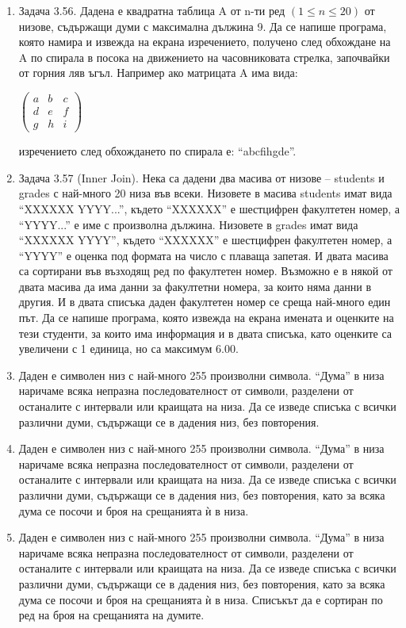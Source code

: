 {\begin{enumerate}[resume]
  \item Задача 3.56. \cite{sbornik} Дадена е квадратна таблица A от n-ти ред $(1 \le n \le 20)$ от низове, съдържащи думи с максимална дължина 9. Да се напише програма, която намира и извежда на екрана изречението, получено след обхождане на A по спирала в посока на движението на часовниковата стрелка, започвайки от горния ляв ъгъл. Например ако матрицата A има вида:

  $\left( \begin{array}{ccc}
  a & b & c \\
  d & e & f \\
  g & h & i
  \end{array} \right)$

  изречението след обхождането по спирала е: ``abcfihgde''.

  \item Задача 3.57 (Inner Join). \cite{sbornik} Нека са дадени два масива от низове – students и grades с най-много 20 низа във всеки. Низовете в масива students имат вида ``XXXXXX YYYY...'', където ``XXXXXX'' е шестцифрен факултетен номер, а ``YYYY...'' е име с произволна дължина. Низовете в grades имат вида ``XXXXXX YYYY'', където ``XXXXXX'' е шестцифрен факултетен номер, а ``YYYY'' е оценка под формата на число с плаваща запетая. И двата масива са сортирани във възходящ ред по факултетен номер. Възможно е в някой от двата масива да има данни за факултетни номера, за които няма данни в другия. И в двата списъка даден факултетен номер се среща най-много един път. Да се напише програма, която извежда на екрана имената и оценките на тези студенти, за които има информация и в двата списъка, като оценките са увеличени с 1 единица, но са максимум 6.00.
  
  \item Даден е символен низ с най-много 255 произволни символа. ``Дума'' в низа наричаме всяка непразна последователност от символи, разделени от останалите с интервали или краищата на низа. Да се изведе списъка с всички различни думи, съдържащи се в дадения низ, без повторения.

  \item Даден е символен низ с най-много 255 произволни символа. ``Дума'' в низа наричаме всяка непразна последователност от символи, разделени от останалите с интервали или краищата на низа. Да се изведе списъка с всички различни думи, съдържащи се в дадения низ, без повторения, като за всяка дума се посочи и броя на срещанията ѝ в низа.

  \item Даден е символен низ с най-много 255 произволни символа. ``Дума'' в низа наричаме всяка непразна последователност от символи, разделени от останалите с интервали или краищата на низа. Да се изведе списъка с всички различни думи, съдържащи се в дадения низ, без повторения, като за всяка дума се посочи и броя на срещанията ѝ в низа. Списъкът да е сортиран по ред на броя на срещанията на думите.



\end{enumerate}}
